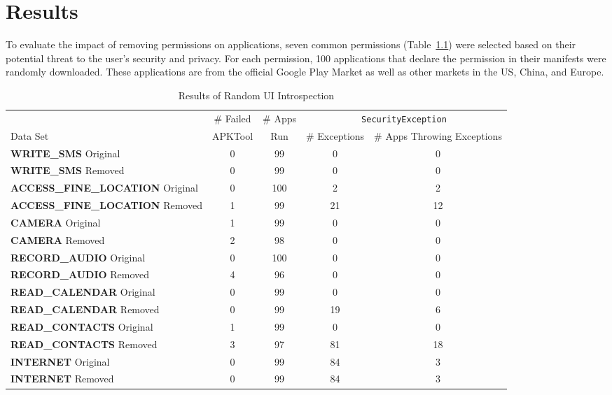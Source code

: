 \chapter{Results}
\label{sec:evaluation}

To evaluate the impact of removing permissions on applications, seven common permissions (Table~\ref{tbl:results}) were selected based on their potential threat to the user's security and privacy.  For each permission, 100 applications that declare the permission in their manifests were randomly downloaded.  These applications are from the official Google Play Market as well as other markets in the US, China, and Europe.

\begin{table}[t]
\centering
\tiny
\begin{tabular}{|l|c|c|c|c|}
\hline
& \# Failed & \# Apps & \multicolumn{2}{|c|}{\texttt{SecurityException}} \\ \cline{4-5}
Data Set & APKTool & Run & \# Exceptions & \# Apps Throwing Exceptions\\ \hline 
{\bfseries \ttfamily WRITE\_SMS} Original & 0 & 99 & 0 & 0 \\ \hline
{\bfseries \ttfamily WRITE\_SMS} Removed & 0 & 99 & 0 & 0 \\ \hline
{\bfseries \ttfamily ACCESS\_FINE\_LOCATION} Original & 0 & 100 & 2 & 2 \\ \hline
{\bfseries \ttfamily ACCESS\_FINE\_LOCATION} Removed & 1 & 99 & 21 & 12 \\ \hline					
{\bfseries \ttfamily CAMERA} Original & 1 & 99 & 0 & 0 \\ \hline
{\bfseries \ttfamily CAMERA} Removed & 2 & 98 & 0 & 0 \\ \hline
{\bfseries \ttfamily RECORD\_AUDIO} Original & 0 & 100 & 0 & 0 \\ \hline
{\bfseries \ttfamily RECORD\_AUDIO} Removed & 4 & 96 & 0 & 0 \\ \hline
{\bfseries \ttfamily READ\_CALENDAR} Original & 0 & 99 & 0 & 0 \\ \hline 
{\bfseries \ttfamily READ\_CALENDAR} Removed & 0 & 99 & 19 & 6 \\ \hline
{\bfseries \ttfamily READ\_CONTACTS} Original & 1 & 99 & 0 & 0 \\ \hline
{\bfseries \ttfamily READ\_CONTACTS} Removed & 3 & 97 & 81 & 18 \\ \hline
{\bfseries \ttfamily INTERNET} Original & 0 & 99 & 84 & 3 \\ \hline
{\bfseries \ttfamily INTERNET} Removed & 0 & 99 & 84 & 3 \\ \hline
\end{tabular}
\caption{Results of Random UI Introspection}
\label{tbl:results}
\end{table}


